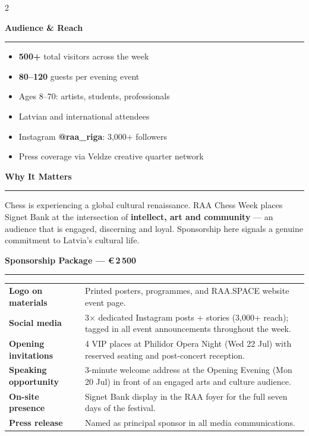 \documentclass[a4paper,10pt]{article}
\newcommand{\sectionrule}[1]{%
  \vspace{4pt}%
  {\color{raared}\bfseries\large #1}\\[-2pt]%
  {\color{raared}\rule{\linewidth}{0.8pt}}%
  \vspace{3pt}%
}
\begin{document}
\begin{center}
\begin{minipage}{0.87\paperwidth}
\begin{multicols}{2}
\columnbreak

\sectionrule{Audience \& Reach}

{\small
\begin{itemize}[leftmargin=*,itemsep=2pt,topsep=0pt]
  \item \textbf{500+} total visitors across the week
  \item \textbf{80–120} guests per evening event
  \item Ages 8–70: artists, students, professionals
  \item Latvian and international attendees
  \item Instagram \textbf{@raa\_riga}: 3,000+ followers
  \item Press coverage via Veldze creative quarter network
\end{itemize}
}

\vspace{0.3cm}
\sectionrule{Why It Matters}

{\small Chess is experiencing a global cultural renaissance. RAA Chess Week places Signet Bank at the intersection of \textbf{intellect, art and community} — an audience that is engaged, discerning and loyal. Sponsorship here signals a genuine commitment to Latvia's cultural life.}

\end{multicols}

\vspace{0.15cm}

\sectionrule{Sponsorship Package — €\,2\,500}

{\small
\begin{tabularx}{\linewidth}{@{} >{\bfseries}p{3.2cm} X @{}}
Logo on materials    & Printed posters, programmes, and RAA.SPACE website event page. \\[2pt]
Social media         & 3× dedicated Instagram posts + stories (3,000+ reach); tagged in all event announcements throughout the week. \\[2pt]
Opening invitations  & 4 VIP places at Philidor Opera Night (Wed 22 Jul) with reserved seating and post-concert reception. \\[2pt]
Speaking opportunity & 3-minute welcome address at the Opening Evening (Mon 20 Jul) in front of an engaged arts and culture audience. \\[2pt]
On-site presence     & Signet Bank display in the RAA foyer for the full seven days of the festival. \\[2pt]
Press release        & Named as principal sponsor in all media communications. \\
\end{tabularx}
}


\end{minipage}
\end{center}
\end{document}
